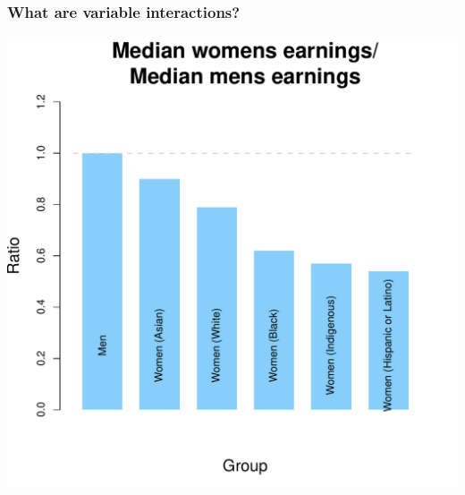 \documentclass[aspectratio=169]{beamer}
\theoremstyle{principle}
\begin{document}
\begin{frame}
\frametitle{What are \textbf{variable interactions}?}

\begin{center}
\includegraphics[scale=0.4]{gender_wage_gap_DA.pdf}
\end{center}

\end{frame}

%
%
%
%
%
%
\end{document}
